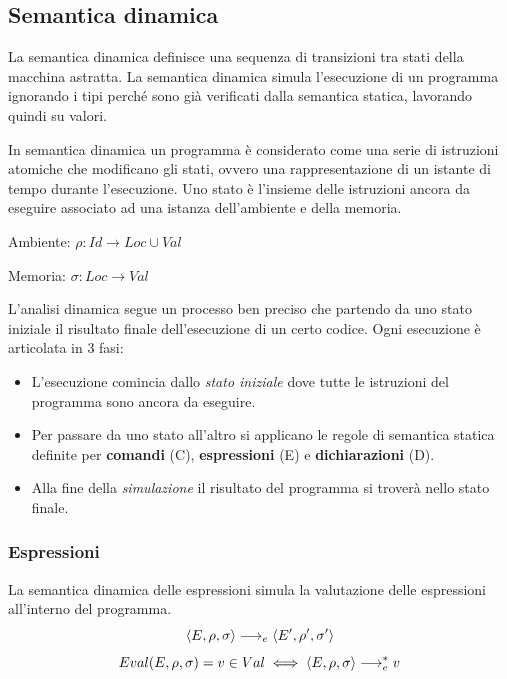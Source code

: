 \documentclass{article}
\begin{document}
\pagebreak
\subsection{Semantica dinamica}
La semantica dinamica definisce una sequenza di transizioni tra stati della macchina astratta. La semantica dinamica simula l'esecuzione di un programma ignorando i tipi perché sono già verificati dalla semantica statica, lavorando quindi su valori.

In semantica dinamica un programma è considerato come una serie di istruzioni atomiche che modificano gli stati, ovvero una rappresentazione di un istante di tempo durante l'esecuzione. Uno stato è l'insieme delle istruzioni ancora da eseguire associato ad una istanza dell'ambiente e della memoria.

\begin{dfn}{Ambiente: }
    \(\rho: Id \rightarrow Loc \cup Val\)
\end{dfn}
\begin{dfn}{Memoria: }
    \(\sigma: Loc \rightarrow Val\)
\end{dfn}

L'analisi dinamica segue un processo ben preciso che partendo da uno stato iniziale   il risultato finale dell'esecuzione di un certo codice. Ogni esecuzione è articolata in 3 fasi:
\begin{itemize}
    \item L'esecuzione comincia dallo \emph{stato iniziale} dove tutte le istruzioni del programma sono ancora da eseguire.
    \item Per passare da uno stato all'altro si applicano le regole di semantica statica definite per \textbf{comandi} (C), \textbf{espressioni} (E) e \textbf{dichiarazioni} (D).
    \item Alla fine della \emph{simulazione} il risultato del programma si troverà nello stato finale.
\end{itemize}

\subsubsection{Espressioni}
La semantica dinamica delle espressioni simula la valutazione delle espressioni all'interno del programma.
\[\langle E,\rho,\sigma \rangle \longrightarrow_e \langle E',\rho',\sigma' \rangle\]
\[Eval(E,\rho,\sigma) = v \in Val \iff \langle E,\rho,\sigma \rangle \longrightarrow_e^* v\]
\end{document}
